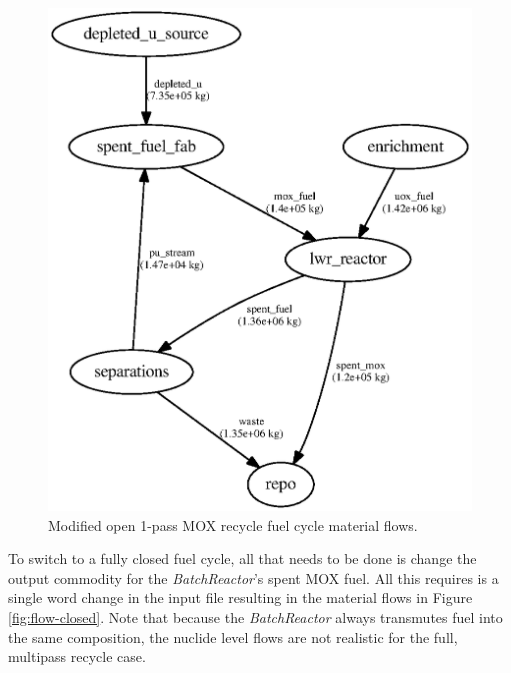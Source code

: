 \begin{figure}[!]
\label{fig:flow-modopen}
\caption{Modified open 1-pass MOX recycle fuel cycle material flows.}
\begin{center}
\includegraphics{./images/flow-mod-open-1.eps}
\end{center}
\end{figure}

To switch to a fully closed fuel cycle, all that needs to be done is change
the output commodity for the \textit{BatchReactor}'s spent MOX fuel.  All this
requires is a single word change in the input file resulting in the material
flows in Figure \ref{fig:flow-closed}.  Note that because the
\textit{BatchReactor} always transmutes fuel into the same composition, the
nuclide level flows are not realistic for the full, multipass recycle case.


